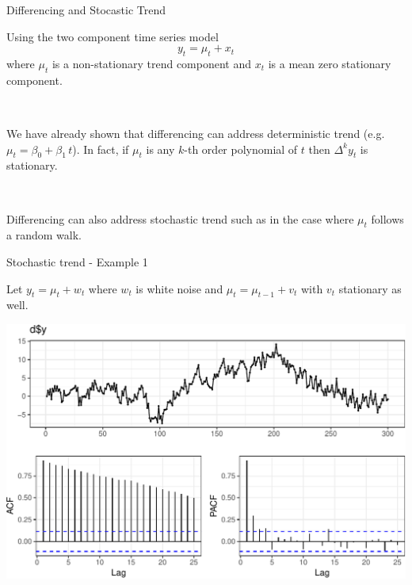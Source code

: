 \documentclass[11pt,ignorenonframetext,]{beamer}
\begin{document}
\begin{frame}[t]{%
\protect\hypertarget{differencing-and-stocastic-trend}{%
Differencing and Stocastic Trend}}

Using the two component time series model \[ y_t = \mu_t + x_t \] where
\(\mu_t\) is a non-stationary trend component and \(x_t\) is a mean zero
stationary component.

\(~\)

We have already shown that differencing can address deterministic trend
(e.g. \(\mu_t = \beta_0+\beta_1 \, t\)). In fact, if \(\mu_t\) is any
\(k\)-th order polynomial of \(t\) then \(\Delta^k y_t\) is stationary.

\(~\)

Differencing can also address stochastic trend such as in the case where
\(\mu_t\) follows a random walk.

\end{frame}

\begin{frame}[t]{%
\protect\hypertarget{stochastic-trend---example-1}{%
Stochastic trend - Example 1}}

Let \(y_t = \mu_t + w_t\) where \(w_t\) is white noise and
\(\mu_t = \mu_{t-1} + v_t\) with \(v_t\) stationary as well.

\begin{center}\includegraphics[width=\textwidth]{Lec09_files/figure-beamer/unnamed-chunk-1-1} \end{center}

\end{frame}
\end{document}
